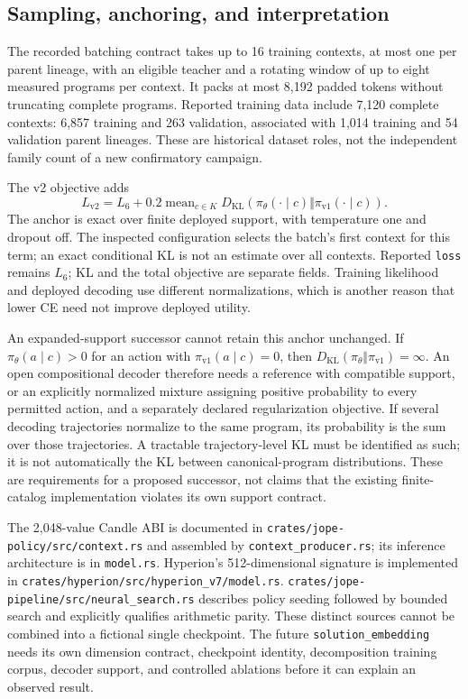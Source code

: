 \subsection{Sampling, anchoring, and interpretation}

The recorded batching contract takes up to 16 training contexts, at most one per
parent lineage, with an eligible teacher and a rotating window of up to eight
measured programs per context. It packs at most 8,192 padded tokens without
truncating complete programs. Reported training data include 7,120 complete
contexts: 6,857 training and 263 validation, associated with 1,014 training and
54 validation parent lineages. These are historical dataset roles, not the
independent family count of a new confirmatory campaign.

The v2 objective adds
\begin{equation}
 L_{\mathrm{v2}}=L_6+
 0.2\operatorname{mean}_{c\in K}
 D_{\mathrm{KL}}(\pi_\theta(\cdot\mid c)\Vert\pi_{\mathrm{v1}}(\cdot\mid c)).
\end{equation}
The anchor is exact over finite deployed support, with temperature one and
dropout off. The inspected configuration selects the batch's first context for
this term; an exact conditional KL is not an estimate over all contexts.
Reported \texttt{loss} remains $L_6$; KL and the total objective are separate
fields. Training likelihood and deployed decoding use different normalizations,
which is another reason that lower CE need not improve deployed utility.

An expanded-support successor cannot retain this anchor unchanged. If
$\pi_\theta(a\mid c)>0$ for an action with
$\pi_{\mathrm{v1}}(a\mid c)=0$, then
$D_{\mathrm{KL}}(\pi_\theta\Vert\pi_{\mathrm{v1}})=\infty$.
An open compositional decoder therefore needs a reference with compatible
support, or an explicitly normalized mixture assigning positive probability
to every permitted action, and a separately declared regularization objective.
If several decoding trajectories normalize to the same program, its probability
is the sum over those trajectories. A tractable trajectory-level KL must be
identified as such; it is not automatically the KL between canonical-program
distributions. These are requirements for a proposed successor, not claims that
the existing finite-catalog implementation violates its own support contract.

The 2,048-value Candle ABI is documented in
\nolinkurl{crates/jope-policy/src/context.rs} and assembled by
\texttt{context\_producer.rs}; its inference architecture is in
\texttt{model.rs}. Hyperion's 512-dimensional signature is implemented in
\nolinkurl{crates/hyperion/src/hyperion_v7/model.rs}.
\nolinkurl{crates/jope-pipeline/src/neural_search.rs} describes policy seeding
followed by bounded search and explicitly qualifies arithmetic parity.
These distinct sources cannot be combined into a fictional single checkpoint.
The future \texttt{solution\_embedding} needs its own dimension contract,
checkpoint identity, decomposition training corpus, decoder support, and
controlled ablations before it can explain an observed result.

